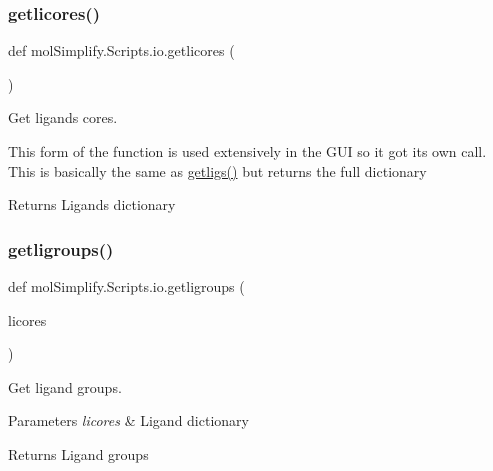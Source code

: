 \subsubsection{\texorpdfstring{getlicores()}{getlicores()}}
{\footnotesize\ttfamily def mol\+Simplify.\+Scripts.\+io.\+getlicores (\begin{DoxyParamCaption}{ }\end{DoxyParamCaption})}



Get ligands cores. 

This form of the function is used extensively in the G\+UI so it got it\textquotesingle{}s own call. This is basically the same as \hyperlink{namespacemolSimplify_1_1Scripts_1_1io_a20155860cf65f34b07ec8a16d43a5c1e}{getligs()} but returns the full dictionary \begin{DoxyReturn}{Returns}
Ligands dictionary 
\end{DoxyReturn}
\mbox{\label{namespacemolSimplify_1_1Scripts_1_1io_a8ff3ee822809c0232ea5fa3573906b28}} 
\subsubsection{\texorpdfstring{getligroups()}{getligroups()}}
{\footnotesize\ttfamily def mol\+Simplify.\+Scripts.\+io.\+getligroups (\begin{DoxyParamCaption}\item[{}]{licores }\end{DoxyParamCaption})}



Get ligand groups. 


\begin{DoxyParams}{Parameters}
{\em licores} & Ligand dictionary \\
\hline
\end{DoxyParams}
\begin{DoxyReturn}{Returns}
Ligand groups 
\end{DoxyReturn}
\mbox{\label{namespacemolSimplify_1_1Scripts_1_1io_a20155860cf65f34b07ec8a16d43a5c1e}} 
